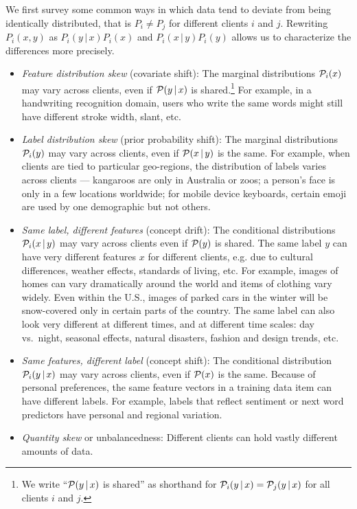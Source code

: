 \documentclass[11pt]{article}
\begin{document}
\newcommand{\gvn}{\,|\,}

We first survey some common ways in which data tend to deviate from being identically distributed, that is $P_i \neq P_j$ for different clients $i$ and $j$. Rewriting $P_i(x, y)$ as $P_i(y \gvn x) P_i(x)$ and $P_i(x \gvn y) P_i(y)$ allows us to characterize the differences more precisely.
\begin{itemize}
    \item \emph{Feature distribution skew} (covariate shift): The marginal distributions $\mathcal{P}_i(x)$ may vary across clients, even if $\Ploc(y \gvn x)$ is shared.\footnote{We write ``$\Ploc(y \gvn x)$ is shared'' as shorthand for $\Ploc_i(y \gvn x) = \Ploc_j(y \gvn x)$  for all clients $i$ and $j$.} For example, in a handwriting recognition domain, users who write the same words might still have different stroke width, slant, etc. 
    
    \item \emph{Label distribution skew} (prior probability shift): The marginal distributions $\mathcal{P}_i(y)$ may vary across clients, even if $\Ploc(x \gvn y)$ is the same. For example, when clients are tied to particular geo-regions, the distribution of labels varies across clients --- kangaroos are only in Australia or zoos; a person's face is only in a few locations worldwide; for mobile device keyboards, certain emoji are used by one demographic but not others.
    
    \item \emph{Same label, different features} (concept drift): The conditional distributions $\Ploc_i(x \gvn y)$ may vary across clients even if $\mathcal{P}(y)$ is shared. The same label $y$ can have very different features $x$ for different clients, e.g. due to cultural differences, weather effects, standards of living, etc.
    For example, images of homes can vary dramatically around the world and items of clothing vary widely.  
    Even within the U.S., images of parked cars in the winter will be snow-covered only in certain parts of the country.  
    The same label can also look very different at different times, and at different time scales: day vs.~night, seasonal effects, natural disasters, fashion and design trends, etc.
    
    \item \emph{Same features, different label} (concept shift): The conditional distribution $\Ploc_i(y \gvn x)$ may vary across clients, even if $\mathcal{P}(x)$ is the same. Because of personal preferences, the same feature vectors in a training data item can have different labels.  
    For example, labels that reflect sentiment or next word predictors have personal and regional variation.
    
  \item \emph{Quantity skew} or unbalancedness: Different clients can hold vastly different amounts of data.
\end{itemize}
\end{document}
